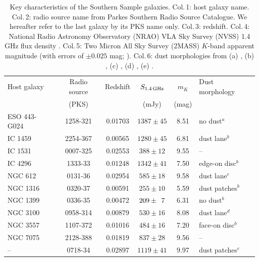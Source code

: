 \documentclass[a4paper,fleqn,usenatbib]{mnras}
\begin{document}
	\begin{table}
		\centering
		\caption{Key characteristics of the Southern Sample galaxies. Col.\,1: host galaxy name. Col.\,2: radio source name from Parkes Southern Radio Source Catalogue. We hereafter refer to the last galaxy by its PKS name only. Col.\,3: redshift. Col.\,4: National Radio Astronomy Observatory (NRAO) VLA Sky Survey (NVSS) 1.4 GHz flux density \citep{Condon1998}. Col.\,5: Two Micron All Sky Survey (2MASS) $K$-band apparent magnitude (with errors of $\pm 0.025$ mag; \citealt{Skrutskie2006}). Col.\,6: dust morphologies from (a) \citet{Govoni2000}, (b) \citet{Lauer2005}, (c) \citet{Bettoni2001}, (d) \citet{Sandage1979}, (e) \citet{Colbert2001}.}
		\label{tab:sample}
		\begin{tabular}{l c c c c l}
			\hline
			\hline
			Host galaxy	& Radio source 	& Redshift	& $S_\text{1.4\,GHz}$	& $m_K$ & Dust morphology\\
						& (PKS) 		& 			& (mJy) 			& (mag)	&\\
			\hline 
			ESO 443-G024 & 1258-321 	& 0.01703	& $1387 \pm 45$		& 8.51 & no dust$^{a}$	\\ 
			IC 1459 	& 2254-367 		& 0.00565 	& $1280 \pm 45$		& 6.81 & dust lane$^{b}$	\\
			IC 1531 	& 0007-325 		& 0.02553 	& \leavevmode\phantom{0}$388 \pm 12$		& 9.55 & --					\\
			IC 4296		& 1333-\leavevmode\phantom{0}33 		& 0.01248 	& $1342 \pm 41$		& 7.50 & edge-on disc$^{b}$ \\
			NGC 612 	& 0131-\leavevmode\phantom{0}36 		& 0.02954 	& \leavevmode\phantom{0}$585 \pm 18$		& 9.58 & dust lane$^{c}$	\\
			NGC 1316 	& 0320-\leavevmode\phantom{0}37 & 0.00591 	& \leavevmode\phantom{0}$255 \pm 10$		& 5.59 & dust patches$^{b}$ \\
			NGC 1399 	& 0336-\leavevmode\phantom{0}35 & 0.00472 	& \leavevmode\phantom{0}$209 \pm \leavevmode\phantom{0}7$	& 6.31 & no dust$^{b}$	\\
			NGC 3100 	& 0958-314 		& 0.00879 	& \leavevmode\phantom{0}$530 \pm 16$		& 8.08 & dust lane$^{d}$	\\
			NGC 3557 	& 1107-372 		& 0.01016 	& \leavevmode\phantom{0}$484 \pm 16$		& 7.20 & face-on disc$^{b}$\\
			NGC 7075 	& 2128-388 		& 0.01819 	& \leavevmode\phantom{0}$837 \pm 28$		& 9.56 & --					\\
			--			& 0718-\leavevmode\phantom{0}34 		& 0.02897 	& $1119 \pm 41$		& 9.97 & dust patches$^{e}$ \\

\end{tabular}
\end{table}
\end{document}
